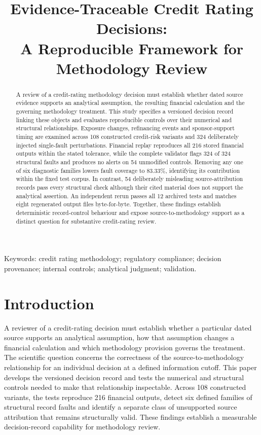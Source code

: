 \documentclass[11pt,a4paper]{article}
\title{Evidence-Traceable Credit Rating Decisions:\\ A Reproducible Framework for Methodology Review}
\author{}
\date{}
\begin{document}
\maketitle
\thispagestyle{plain}

\begin{abstract}
A review of a credit-rating methodology decision must establish whether dated source evidence supports an analytical assumption, the resulting financial calculation and the governing methodology treatment. This study specifies a versioned decision record linking these objects and evaluates reproducible controls over their numerical and structural relationships. Exposure changes, refinancing events and sponsor-support timing are examined across 108 constructed credit-risk variants and 324 deliberately injected single-fault perturbations. Financial replay reproduces all 216 stored financial outputs within the stated tolerance, while the complete validator flags 324 of 324 structural faults and produces no alerts on 54 unmodified controls. Removing any one of six diagnostic families lowers fault coverage to 83.33\%, identifying its contribution within the fixed test corpus. In contrast, 54 deliberately misleading source-attribution records pass every structural check although their cited material does not support the analytical assertion. An independent rerun passes all 12 archived tests and matches eight regenerated output files byte-for-byte. Together, these findings establish deterministic record-control behaviour and expose source-to-methodology support as a distinct question for substantive credit-rating review.
\end{abstract}
\noindent Keywords: credit rating methodology; regulatory compliance; decision provenance; internal controls; analytical judgment; validation.

\section{Introduction}

A reviewer of a credit-rating decision must establish whether a particular dated source supports an analytical assumption, how that assumption changes a financial calculation and which methodology provision governs the treatment. The scientific question concerns the correctness of the source-to-methodology relationship for an individual decision at a defined information cutoff. This paper develops the versioned decision record and tests the numerical and structural controls needed to make that relationship inspectable. Across 108 constructed variants, the tests reproduce 216 financial outputs, detect six defined families of structural record faults and identify a separate class of unsupported source attribution that remains structurally valid. These findings establish a measurable decision-record capability for methodology review.
\end{document}

